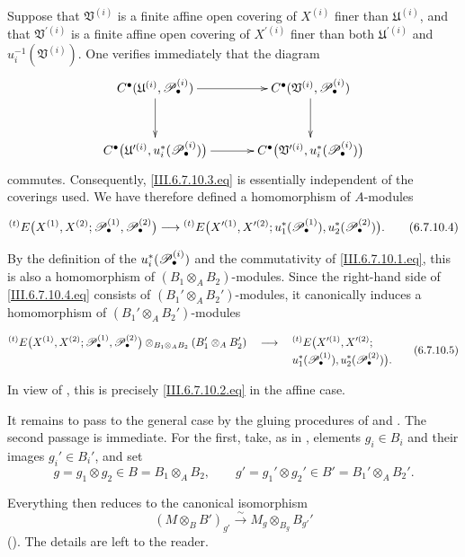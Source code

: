 \begin{env}[6.7.10]
Suppose that $\mathfrak V^{(i)}$ is a finite affine open covering
of $X^{(i)}$ finer than $\mathfrak U^{(i)}$, and that
$\mathfrak V^{\prime(i)}$ is a finite affine open covering of
$X^{\prime(i)}$ finer than both $\mathfrak U^{\prime(i)}$ and
$u_i^{-1}(\mathfrak V^{(i)})$.  One verifies immediately that the
diagram
\[
\xymatrix@C=34pt@R=30pt{
  C^\bullet(\mathfrak U^{(i)},\sh P_\bullet^{(i)})
  \ar[r]\ar[d]
  &
  C^\bullet(\mathfrak V^{(i)},\sh P_\bullet^{(i)})
  \ar[d]
  \\
  C^\bullet
  \bigl(
    \mathfrak U^{\prime(i)},u_i^*(\sh P_\bullet^{(i)})
  \bigr)
  \ar[r]
  &
  C^\bullet
  \bigl(
    \mathfrak V^{\prime(i)},u_i^*(\sh P_\bullet^{(i)})
  \bigr)
}
\]
commutes.  Consequently, \eqref{III.6.7.10.3.eq} is essentially
independent of the coverings used.  We have therefore defined a
homomorphism of $A$-modules
\begin{env}[6.7.10.4]
\label{III.6.7.10.4}
\[
  {}^{(t)}E
  \bigl(
    X^{(1)},X^{(2)};
    \mathscr{P}_\bullet^{(1)},\mathscr{P}_\bullet^{(2)}
  \bigr)
  \longrightarrow
  {}^{(t)}E
  \bigl(
    X^{\prime(1)},X^{\prime(2)};
    u_1^*(\mathscr{P}_\bullet^{(1)}),
    u_2^*(\mathscr{P}_\bullet^{(2)})
  \bigr).
  \tag{6.7.10.4}\label{III.6.7.10.4.eq}
\]
\end{env}
By the definition of the $u_i^*(\mathscr{P}_\bullet^{(i)})$ and the
commutativity of \eqref{III.6.7.10.1.eq}, this is also a
homomorphism of $(B_1\otimes_AB_2)$-modules.  Since the right-hand
side of \eqref{III.6.7.10.4.eq} consists of
$(B_1'\otimes_AB_2')$-modules, it canonically induces a
homomorphism of $(B_1'\otimes_AB_2')$-modules
\begin{env}[6.7.10.5]
\label{III.6.7.10.5}
\[
\begin{split}
  {}^{(t)}E
  \bigl(
    X^{(1)},X^{(2)};
    \mathscr{P}_\bullet^{(1)},\mathscr{P}_\bullet^{(2)}
  \bigr)
  \otimes_{B_1\otimes_AB_2}
  (B_1'\otimes_AB_2')
  \quad\longrightarrow\quad{}&
  {}^{(t)}E
  \bigl(
    X^{\prime(1)},X^{\prime(2)};
\\[-2pt]
    &u_1^*(\mathscr{P}_\bullet^{(1)}),
    u_2^*(\mathscr{P}_\bullet^{(2)})
  \bigr).
\end{split}
\tag{6.7.10.5}\label{III.6.7.10.5.eq}
\]
\end{env}
In view of , this is precisely
\eqref{III.6.7.10.2.eq} in the affine case.

It remains to pass to the general case by the gluing procedures of
 and .  The second passage is
immediate.  For the first, take, as in , elements
$g_i\in B_i$ and their images $g_i'\in B_i'$, and set
\[
  g=g_1\otimes g_2\in B=B_1\otimes_AB_2,
  \qquad
  g'=g_1'\otimes g_2'\in B'=B_1'\otimes_AB_2'.
\]


Everything then reduces to the canonical isomorphism
\[
  (M\otimes_BB')_{g'}
  \xrightarrow{\sim}
  M_g\otimes_{B_g}B_{g'}'
\]
().  The details are left to the reader.
\end{env}

